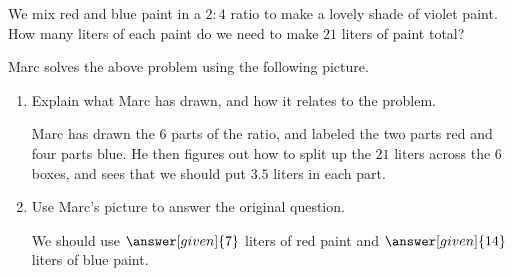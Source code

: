 \documentclass[nooutcomes]{ximera}
\begin{document}
\begin{problem}
We mix red and blue paint in a $2 : 4$ ratio to make a lovely shade of violet paint.  How many liters of each paint do we need to make $21$ liters of paint total? 

Marc solves the above problem using the following picture.

\begin{center}
\end{center}

\begin{enumerate}
\item Explain what Marc has drawn, and how it relates to the problem.
\begin{freeResponse}
\begin{hint}
Marc has drawn the $6$ parts of the ratio, and labeled the two parts red and four parts blue.  He then figures out how to split up the $21$ liters across the $6$ boxes, and sees that we should put $3.5$ liters in each part.
\end{hint}
\end{freeResponse}
\item Use Marc's picture to answer the original question.
\begin{prompt}
We should use $\answer[given]{7}$ liters of red paint and $\answer[given]{14}$ liters of blue paint.
\end{prompt}
\end{enumerate}

\end{problem}
\end{document}
